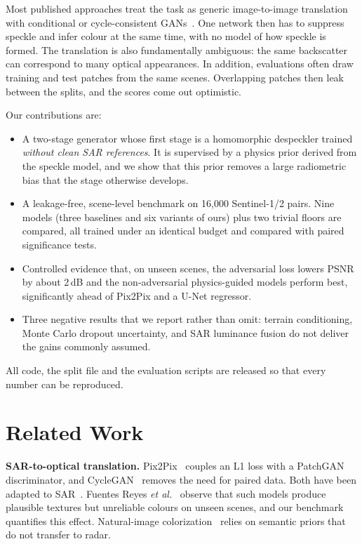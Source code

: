 \documentclass[conference]{IEEEtran}
\begin{document}
Most published approaches treat the task as generic image-to-image translation with conditional or cycle-consistent
GANs~\cite{isola2017pix2pix,zhu2017cyclegan,wang2019sar2opt,fuentes2019sar2opt}. One network then has to suppress speckle and
infer colour at the same time, with no model of how speckle is formed. The translation is also fundamentally ambiguous: the
same backscatter can correspond to many optical appearances. In addition, evaluations often draw training and test patches
from the same scenes. Overlapping patches then leak between the splits, and the scores come out optimistic.

Our contributions are:
\begin{itemize}
\item A two-stage generator whose first stage is a homomorphic despeckler trained \emph{without clean SAR references}. It is
supervised by a physics prior derived from the speckle model, and we show that this prior removes a large radiometric bias
that the stage otherwise develops.
\item A leakage-free, scene-level benchmark on 16{,}000 Sentinel-1/2 pairs. Nine models (three baselines and six variants of ours)
plus two trivial floors are compared, all trained under an identical budget and compared with paired significance tests.
\item Controlled evidence that, on unseen scenes, the adversarial loss lowers PSNR by about 2\,dB and the non-adversarial
physics-guided models perform best, significantly ahead of Pix2Pix and a U-Net regressor.
\item Three negative results that we report rather than omit: terrain conditioning, Monte Carlo dropout uncertainty, and SAR
luminance fusion do not deliver the gains commonly assumed.
\end{itemize}
All code, the split file and the evaluation scripts are released so that every number can be reproduced.

\section{Related Work}
\textbf{SAR-to-optical translation.} Pix2Pix~\cite{isola2017pix2pix} couples an L1 loss with a PatchGAN discriminator, and
CycleGAN~\cite{zhu2017cyclegan} removes the need for paired data. Both have been adapted to SAR~\cite{wang2019sar2opt,fuentes2019sar2opt}.
Fuentes Reyes \emph{et al.}~\cite{fuentes2019sar2opt} observe that such models produce plausible textures but unreliable colours
on unseen scenes, and our benchmark quantifies this effect. Natural-image colorization~\cite{zhang2016colorful} relies on semantic
priors that do not transfer to radar.
\end{document}
